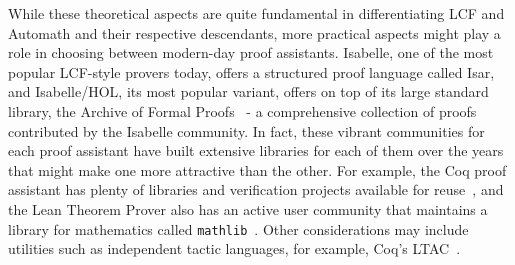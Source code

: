 \documentclass{article}
\begin{document}
	While these theoretical aspects 
	are quite fundamental in 
	differentiating LCF and Automath 
	and their respective descendants, 
	more practical aspects might 
	play a role in choosing between 
	modern-day proof assistants. 
	Isabelle, one of the most 
	popular LCF-style provers today,
	offers a structured proof language
	called Isar, and Isabelle/HOL, 
	its most popular variant,
	offers on top of its large 
	standard library, the Archive
	of Formal Proofs~\cite{afp} - a 
	comprehensive collection of 
	proofs contributed by the 
	Isabelle community. In fact, 
	these vibrant communities for 
	each proof assistant have 
	built extensive libraries 
	for each of them over the years 
	that might make one more 
	attractive than the other. For 
	example, the Coq proof assistant
	has plenty of libraries and 
	verification projects available 
	for reuse~\cite{coqlib}, and 
	the Lean Theorem Prover also has 
	an active user community that 
	maintains a library for 
	mathematics called 
	\texttt{mathlib}~\cite{10.1145/3372885.3373824}.
	Other considerations may 
	include utilities such as 
	independent tactic languages, 
	for example, Coq's 
	LTAC~\cite{10.1007/3-540-44404-1_7}.
	
  	


\end{document}
